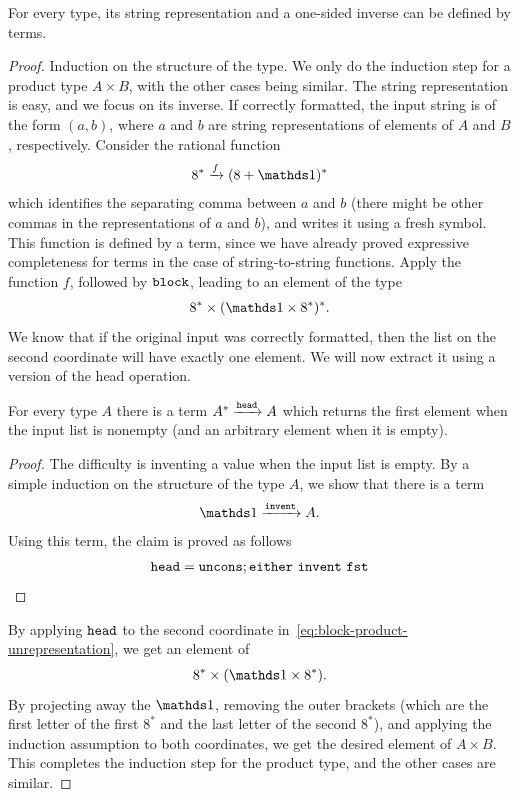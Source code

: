 \begin{lemma}\label{lem:terms-define-string-representation}
    For every type, its string representation and a one-sided inverse  can be defined by terms.
\end{lemma}
\begin{proof}
    Induction on the structure of the type. We only do the induction step for a product type $A \times B$, with the other cases being similar. The string representation is easy, and we focus on its inverse. If correctly formatted, the input string is of the form $(a,b)$, where $a$ and $b$ are string representations of elements of $A$ and $B$, respectively. Consider the rational function 
    \begin{align*}
    8^* \xrightarrow f (8 + \onetype)^*
    \end{align*}
    which identifies the separating comma between $a$ and $b$ (there might be other commas in the representations of $a$ and $b$), and writes it using a fresh symbol. This function is defined by a term, since we have already proved expressive completeness for terms in the case of string-to-string functions. Apply the function $f$, followed by $\mathtt{block}$, leading to an element of the type
\begin{align}\label{eq:block-product-unrepresentation}
    8^* \times (\onetype \times 8^*)^*.
\end{align}
We know that if the original input was correctly formatted, then the list on the second coordinate will have exactly one element. We will now extract it using a version of the head operation.
\begin{claim}
    \label{claim:head}
    For every type $A$ there is a term  $A^* \xrightarrow {\mathtt{head}} A$ which returns the first element when the input list is nonempty (and an arbitrary element when it is empty). 
\end{claim}
\begin{proof}
    The difficulty is inventing a value when the input list is empty. By a simple induction on the structure of the type $A$, we show that there is a term
    \begin{align*}
    \onetype \xrightarrow{\inventterm} A.
    \end{align*}
    Using this term, the claim is proved as follows
    \begin{align*}
   \mathtt{head} =  \mathtt{uncons}; \mathtt{either}\ \mathtt{invent}\ \mathtt{fst}
    \end{align*}
\end{proof}
By applying $\mathtt{head}$  to the second coordinate in~\eqref{eq:block-product-unrepresentation}, we get an element of 
\begin{align*}
8^* \times (\onetype \times 8^*).
\end{align*}
By projecting away the $\onetype$, removing the outer brackets (which are the first letter of the first $8^*$ and the last letter of the second $8^*$), and applying the induction assumption to both coordinates, we get the desired element of $A \times B$. This completes the induction step for the product type, and the other cases are similar.
\end{proof}


